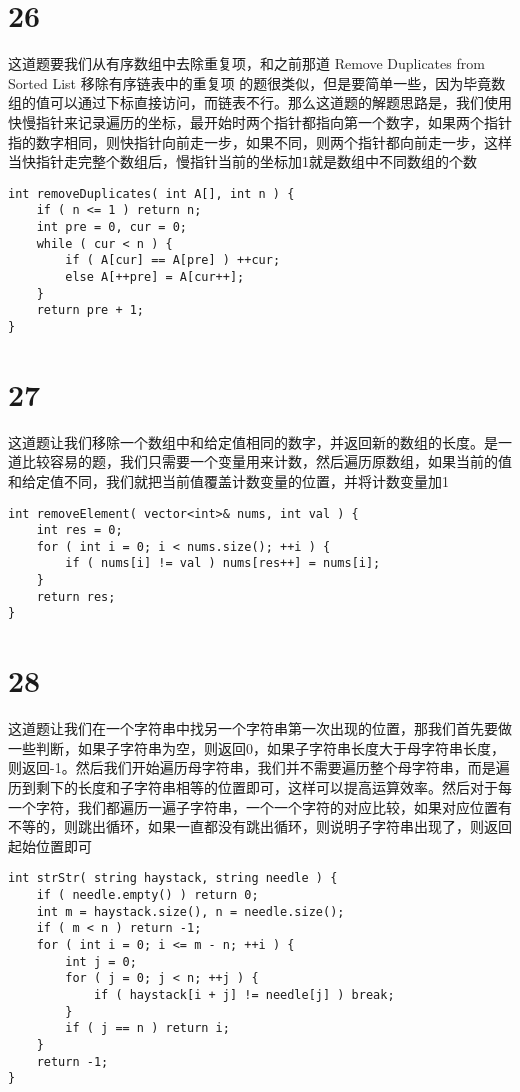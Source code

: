 \documentclass[12pt,a4paper]{article}
\begin{document}
\section{26}
\begin{CJK}{UTF8}{gbsn}
这道题要我们从有序数组中去除重复项，和之前那道 Remove Duplicates from Sorted List 移除有序链表中的重复项 的题很类似，但是要简单一些，因为毕竟数组的值可以通过下标直接访问，而链表不行。那么这道题的解题思路是，我们使用快慢指针来记录遍历的坐标，最开始时两个指针都指向第一个数字，如果两个指针指的数字相同，则快指针向前走一步，如果不同，则两个指针都向前走一步，这样当快指针走完整个数组后，慢指针当前的坐标加1就是数组中不同数组的个数
\end{CJK}
\begin{lstlisting}
int removeDuplicates( int A[], int n ) {
	if ( n <= 1 ) return n;
	int pre = 0, cur = 0;
	while ( cur < n ) {
		if ( A[cur] == A[pre] ) ++cur;
		else A[++pre] = A[cur++];
	}
	return pre + 1;
}
\end{lstlisting}

\section{27}
\begin{CJK}{UTF8}{gbsn}
这道题让我们移除一个数组中和给定值相同的数字，并返回新的数组的长度。是一道比较容易的题，我们只需要一个变量用来计数，然后遍历原数组，如果当前的值和给定值不同，我们就把当前值覆盖计数变量的位置，并将计数变量加1
\end{CJK}
\begin{lstlisting}
int removeElement( vector<int>& nums, int val ) {
	int res = 0;
	for ( int i = 0; i < nums.size(); ++i ) {
		if ( nums[i] != val ) nums[res++] = nums[i];
	}
	return res;
}
\end{lstlisting}

\section{28}
\begin{CJK}{UTF8}{gbsn}
这道题让我们在一个字符串中找另一个字符串第一次出现的位置，那我们首先要做一些判断，如果子字符串为空，则返回0，如果子字符串长度大于母字符串长度，则返回-1。然后我们开始遍历母字符串，我们并不需要遍历整个母字符串，而是遍历到剩下的长度和子字符串相等的位置即可，这样可以提高运算效率。然后对于每一个字符，我们都遍历一遍子字符串，一个一个字符的对应比较，如果对应位置有不等的，则跳出循环，如果一直都没有跳出循环，则说明子字符串出现了，则返回起始位置即可
\end{CJK}
\begin{lstlisting}
int strStr( string haystack, string needle ) {
	if ( needle.empty() ) return 0;
	int m = haystack.size(), n = needle.size();
	if ( m < n ) return -1;
	for ( int i = 0; i <= m - n; ++i ) {
		int j = 0;
		for ( j = 0; j < n; ++j ) {
			if ( haystack[i + j] != needle[j] ) break;
		}
		if ( j == n ) return i;
	}
	return -1;
}
\end{lstlisting}
\end{document}
